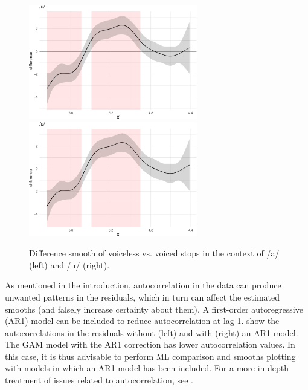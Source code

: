 \documentclass[
  11pt,
]{article}
\begin{document}
\begin{figure}

{\centering \includegraphics[width=.7\linewidth,height=5cm]{2018-polar-gam_files/figure-latex/Figure05} \includegraphics[width=.7\linewidth,height=5cm]{2018-polar-gam_files/figure-latex/Figure05} 

}

\caption{Difference smooth of voiceless vs. voiced stops in the context of /a/ (left) and /u/ (right).}\label{f:Figure05}
\end{figure}

As mentioned in the introduction, autocorrelation in the data can
produce unwanted patterns in the residuals, which in turn can affect the
estimated smooths (and falsely increase certainty about them). A
first-order autoregressive (AR1) model can be included to reduce
autocorrelation at lag 1.  show the autocorrelations in
the residuals without (left) and with (right) an AR1 model. The GAM
model with the AR1 correction has lower autocorrelation values. In this
case, it is thus advisable to perform ML comparison and smooths plotting
with models in which an AR1 model has been included. For a more in-depth
treatment of issues related to autocorrelation, see
\citet{soskuthy2017}.
\end{document}
